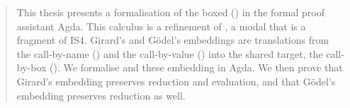 \begin{abstract}
This thesis presents a formalisation of the boxed \lc (\lab) in the formal proof assistant Agda.
This calculus is a refinement of \labox, a modal \lc that is a fragment of \textsf{IS4}.
Girard's and Gödel's embeddings are translations from the call-by-name \lc (\lan) and the call-by-value \lc (\lav) into the shared target, the call-by-box \lc (\lab).
We formalise \lab and these embedding in Agda.
We then prove that Girard's embedding preserves reduction and evaluation, and that Gödel's embedding preserves reduction as well.
\end{abstract}
